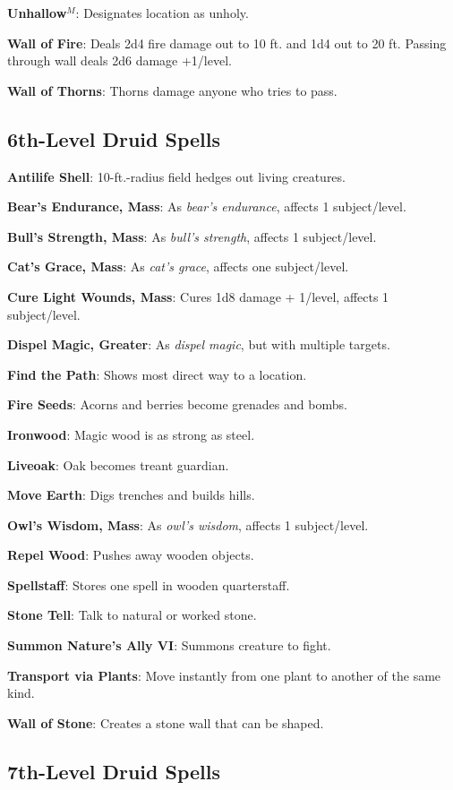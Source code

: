 \textbf{Unhallow}\(^{M}\): Designates location as unholy.

\textbf{Wall of Fire}: Deals 2d4 fire damage out to 10 ft. and 1d4 out to 20 ft. Passing through wall deals 2d6 damage +1/level.

\textbf{Wall of Thorns}: Thorns damage anyone who tries to pass.

\subsection{6th-Level Druid Spells}


\textbf{Antilife Shell}: 10-ft.-radius field hedges out living creatures.

\textbf{Bear's Endurance, Mass}: As \textit{bear's endurance}, affects 1 subject/level.

\textbf{Bull's Strength, Mass}: As \textit{bull's strength}, affects 1 subject/level.

\textbf{Cat's Grace, Mass}: As \textit{cat's grace}, affects one subject/level.

\textbf{Cure Light Wounds, Mass}: Cures 1d8 damage + 1/level, affects 1 subject/level.

\textbf{Dispel Magic, Greater}: As \textit{dispel magic}, but with multiple targets.

\textbf{Find the Path}: Shows most direct way to a location.

\textbf{Fire Seeds}: Acorns and berries become grenades and bombs.

\textbf{Ironwood}: Magic wood is as strong as steel.

\textbf{Liveoak}: Oak becomes treant guardian.

\textbf{Move Earth}: Digs trenches and builds hills.

\textbf{Owl's Wisdom, Mass}: As \textit{owl's wisdom}, affects 1 subject/level.

\textbf{Repel Wood}: Pushes away wooden objects.

\textbf{Spellstaff}: Stores one spell in wooden quarterstaff.

\textbf{Stone Tell}: Talk to natural or worked stone.

\textbf{Summon Nature's Ally VI}: Summons creature to fight.

\textbf{Transport via Plants}: Move instantly from one plant to another of the same kind.

\textbf{Wall of Stone}: Creates a stone wall that can be shaped.

\subsection{7th-Level Druid Spells}


